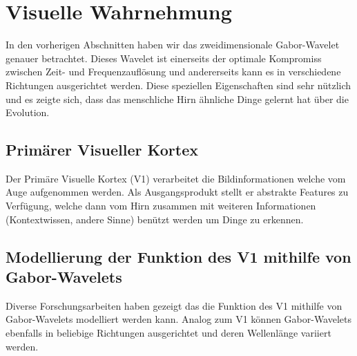 \section{Visuelle Wahrnehmung}

In den vorherigen Abschnitten haben wir das zweidimensionale Gabor-Wavelet genauer betrachtet.
Dieses Wavelet ist einerseits der optimale Kompromiss zwischen Zeit- und Frequenzauflösung und andererseits kann es in verschiedene Richtungen ausgerichtet werden.
Diese speziellen Eigenschaften sind sehr nützlich und es zeigte sich, dass das menschliche Hirn ähnliche Dinge gelernt hat über die Evolution.

\subsection{Primärer Visueller Kortex}

Der Primäre Visuelle Kortex (V1) verarbeitet die Bildinformationen welche vom Auge aufgenommen werden.
Als Ausgangsprodukt stellt er abstrakte Features zu Verfügung, welche dann vom Hirn zusammen mit weiteren Informationen (Kontextwissen, andere Sinne)  benützt werden um Dinge zu erkennen.


\subsection{Modellierung der Funktion des V1 mithilfe von Gabor-Wavelets}

Diverse Forschungsarbeiten haben gezeigt das die Funktion des V1 mithilfe von Gabor-Wavelets modelliert werden kann. %
Analog zum V1 können Gabor-Wavelets ebenfalls in beliebige Richtungen ausgerichtet und deren Wellenlänge variiert werden.